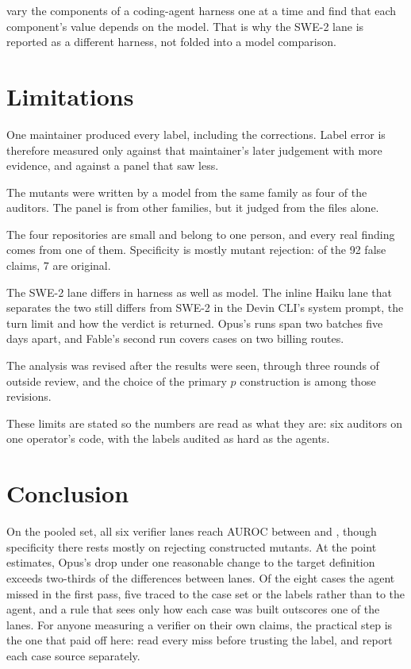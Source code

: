 \documentclass[11pt]{article}
\begin{document}
\citet{fan2026harness} vary the components of a coding-agent harness one at a time and find that each component's value depends on the model. That is why the SWE-2 lane is reported as a different harness, not folded into a model comparison.

\section{Limitations}

One maintainer produced every label, including the corrections. Label error is therefore measured only against that maintainer's later judgement with more evidence, and against a panel that saw less.

The mutants were written by a model from the same family as four of the auditors. The panel is from other families, but it judged from the files alone.

The four repositories are small and belong to one person, and every real finding comes from one of them. Specificity is mostly mutant rejection: of the 92 false claims, 7 are original.

The SWE-2 lane differs in harness as well as model. The inline Haiku lane that separates the two still differs from SWE-2 in the Devin CLI's system prompt, the turn limit and how the verdict is returned. Opus's runs span two batches five days apart, and Fable's second run covers  cases on two billing routes.

The analysis was revised after the results were seen, through three rounds of outside review, and the choice of the primary $p$ construction is among those revisions.

These limits are stated so the numbers are read as what they are: six auditors on one operator's code, with the labels audited as hard as the agents.

\section{Conclusion}

On the pooled set, all six verifier lanes reach AUROC between  and , though specificity there rests mostly on rejecting constructed mutants. At the point estimates, Opus's drop under one reasonable change to the target definition exceeds two-thirds of the differences between lanes. Of the eight cases the agent missed in the first pass, five traced to the case set or the labels rather than to the agent, and a rule that sees only how each case was built outscores one of the lanes. For anyone measuring a verifier on their own claims, the practical step is the one that paid off here: read every miss before trusting the label, and report each case source separately.
\end{document}
